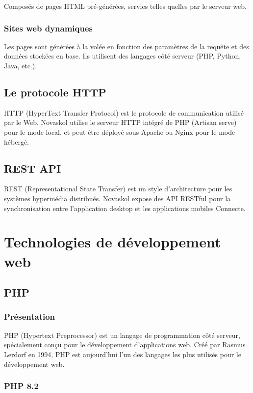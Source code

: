 \documentclass[12pt,a4paper,twoside]{report}
\begin{document}
Composés de pages HTML pré-générées, servies telles quelles par le serveur web.

\subsubsection{Sites web dynamiques}

Les pages sont générées à la volée en fonction des paramètres de la requête et des données stockées en base. Ils utilisent des langages côté serveur (PHP, Python, Java, etc.).

\subsection{Le protocole HTTP}

HTTP (HyperText Transfer Protocol) est le protocole de communication utilisé par le Web. Novaskol utilise le serveur HTTP intégré de PHP (Artisan serve) pour le mode local, et peut être déployé sous Apache ou Nginx pour le mode hébergé.

\subsection{REST API}

REST (Representational State Transfer) est un style d'architecture pour les systèmes hypermédia distribués. Novaskol expose des API RESTful pour la synchronisation entre l'application desktop et les applications mobiles Connecte.

\section{Technologies de développement web}

\subsection{PHP}

\subsubsection{Présentation}

PHP (Hypertext Preprocessor) est un langage de programmation côté serveur, spécialement conçu pour le développement d'applications web. Créé par Rasmus Lerdorf en 1994, PHP est aujourd'hui l'un des langages les plus utilisés pour le développement web.

\subsubsection{PHP 8.2}
\end{document}
